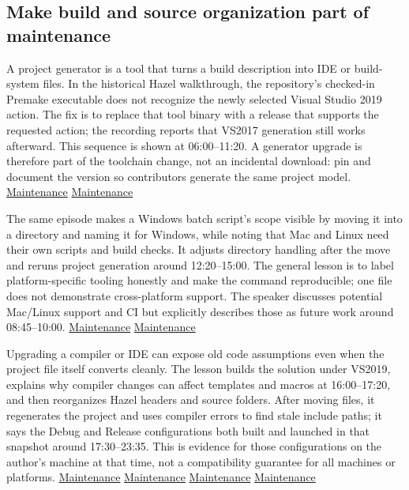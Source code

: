\subsection{Make build and source organization part of maintenance}\label{05-engine-i-ch013-make-build-and-source-organization-part-of-maintenance}

\hypertarget{05-engine-i-ch013-make-build-and-source-organization-part-of-maintenance}{}

A project generator is a tool that turns a build description into IDE or build-system files. In the historical Hazel walkthrough, the repository's checked-in Premake executable does not recognize the newly selected Visual Studio 2019 action. The fix is to replace that tool binary with a release that supports the requested action; the recording reports that VS2017 generation still works afterward. This sequence is shown at 06:00--11:20. A generator upgrade is therefore part of the toolchain change, not an incidental download: pin and document the version so contributors generate the same project model. \href{https://www.youtube.com/watch?v=e9uTV44oOiw&t=360s}{Maintenance} \href{https://www.youtube.com/watch?v=e9uTV44oOiw&t=600s}{Maintenance}

The same episode makes a Windows batch script's scope visible by moving it into a  directory and naming it for Windows, while noting that Mac and Linux need their own scripts and build checks. It adjusts directory handling after the move and reruns project generation around 12:20--15:00. The general lesson is to label platform-specific tooling honestly and make the command reproducible; one  file does not demonstrate cross-platform support. The speaker discusses potential Mac/Linux support and CI but explicitly describes those as future work around 08:45--10:00. \href{https://www.youtube.com/watch?v=e9uTV44oOiw&t=740s}{Maintenance} \href{https://www.youtube.com/watch?v=e9uTV44oOiw&t=525s}{Maintenance}

Upgrading a compiler or IDE can expose old code assumptions even when the project file itself converts cleanly. The lesson builds the solution under VS2019, explains why compiler changes can affect templates and macros at 16:00--17:20, and then reorganizes Hazel headers and source folders. After moving files, it regenerates the project and uses compiler errors to find stale include paths; it says the Debug and Release configurations both built and launched in that snapshot around 17:30--23:35. This is evidence for those configurations on the author's machine at that time, not a compatibility guarantee for all machines or platforms. \href{https://www.youtube.com/watch?v=e9uTV44oOiw&t=960s}{Maintenance} \href{https://www.youtube.com/watch?v=e9uTV44oOiw&t=1050s}{Maintenance} \href{https://www.youtube.com/watch?v=e9uTV44oOiw&t=1320s}{Maintenance} \href{https://www.youtube.com/watch?v=e9uTV44oOiw&t=1410s}{Maintenance}

